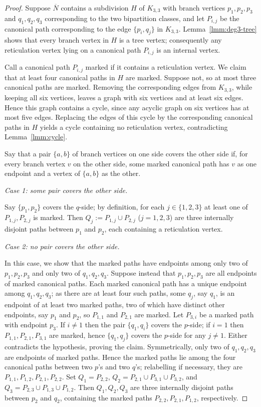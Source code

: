\documentclass[pdflatex,sn-mathphys-num]{sn-jnl}
\theoremstyle{thmstyleone}%
\theoremstyle{thmstyletwo}%
\theoremstyle{thmstylethree}%
\begin{document}
\begin{proof}
Suppose $\overline{N}$ contains a subdivision $H$ of $K_{3,3}$ with branch vertices $p_1,p_2,p_3$ and $q_1,q_2,q_3$ corresponding to the two bipartition classes, and let $P_{i,j}$ be the canonical path corresponding to the edge $\{p_i,q_j\}$ in $K_{3,3}$. Lemma~\ref{lmm:deg3-tree} shows that every branch vertex in $H$ is a tree vertex; consequently any reticulation vertex lying on a canonical path $P_{i,j}$ is an internal vertex.

Call a canonical path $P_{i,j}$ marked if it contains a reticulation vertex. We claim that at least four canonical paths in $H$ are marked. Suppose not, so at most three canonical paths are marked. Removing the corresponding edges from $K_{3,3}$, while keeping all six vertices, leaves a graph with six vertices and at least six edges. Hence this graph contains a cycle, since any acyclic graph on six vertices has at most five edges. Replacing the edges of this cycle by the corresponding canonical paths in $H$ yields a cycle containing no reticulation vertex, contradicting Lemma~\ref{lmm:cycle}.

Say that a pair $\{a,b\}$ of branch vertices on one side covers the other side if, for every branch vertex $v$ on the other side, some marked canonical path has $v$ as one endpoint and a vertex of $\{a,b\}$ as the other.

\smallskip
\noindent\emph{Case 1: some pair covers the other side.}

Say $\{p_1,p_2\}$ covers the $q$-side; by definition, for each $j\in\{1,2,3\}$ at least one of $P_{1,j},P_{2,j}$ is marked. Then $Q_j:=P_{1,j}\cup P_{2,j}$ ($j=1,2,3$) are three internally disjoint paths between $p_1$ and $p_2$, each containing a reticulation vertex.


\smallskip
\noindent\emph{Case 2: no pair covers the other side.}

In this case, we show that the marked paths have endpoints among only two of $p_1,p_2,p_3$ and only two of $q_1,q_2,q_3$. Suppose instead that $p_1,p_2,p_3$ are all endpoints of marked canonical paths. Each marked canonical path has a unique endpoint among $q_1,q_2,q_3$; as there are at least four such paths, some $q_j$, say $q_1$, is an endpoint of at least two marked paths, two of which have distinct other endpoints, say $p_1$ and $p_2$, so $P_{1,1}$ and $P_{2,1}$ are marked. Let $P_{3,i}$ be a marked path with endpoint $p_3$. If $i\neq 1$ then the pair $\{q_1,q_i\}$ covers the $p$-side; if $i=1$ then $P_{1,1},P_{2,1},P_{3,1}$ are marked, hence $\{q_1,q_j\}$ covers the $p$-side for any $j \neq 1$. Either contradicts the hypothesis, proving the claim. Symmetrically, only two of $q_1,q_2,q_3$ are endpoints of marked paths. Hence the marked paths lie among the four canonical paths between two $p$'s and two $q$'s; relabelling if necessary, they are $P_{1,1},P_{1,2},P_{2,1},P_{2,2}$. Set $Q_1=P_{2,2}$, $Q_2=P_{2,1}\cup P_{3,1}\cup P_{3,2}$, and
$Q_3=P_{2,3}\cup P_{1,3}\cup P_{1,2}$. Then $Q_1,Q_2,Q_3$ are three internally disjoint paths between $p_2$ and $q_2$, containing the marked paths $P_{2,2},P_{2,1},P_{1,2}$, respectively.


\end{proof}
\end{document}

